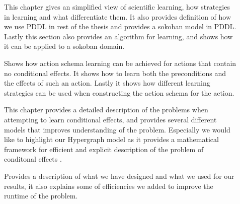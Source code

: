 \documentclass[Master.tex]{subfiles}
\begin{document}
 \begin{description}
 	\item[]
	 	This chapter gives an simplified view of scientific learning, how strategies in learning and what differentiate them. It also provides definition of how we use PDDL in rest of the thesis and provides a sokoban model in PDDL.
	 	Lastly this section also provides an algorithm for learning, and shows how it can be applied to a sokoban domain.
	
	\item[]
		Shows how action schema learning can be achieved for actions that contain no conditional effects. It shows how to learn both the preconditions and the effects of such an action. Lastly it shows how different learning strategies can be used when constructing the action schema for the action.
		
	\item[]
		This chapter provides a detailed description of the problems when attempting to learn conditional effects, and provides several different models that improves understanding of the problem. Especially we would like to highlight our Hypergraph model as it provides a mathematical framework for efficient and explicit description of the problem of conditonal effects .
	
	\item[]
		Provides a description of what we have designed and what we used for our results, it also explains some of efficiencies we added to improve the runtime of the problem.
	
	\item[]
		
	
	\item[]
 
\end{description}
	
\end{document}
